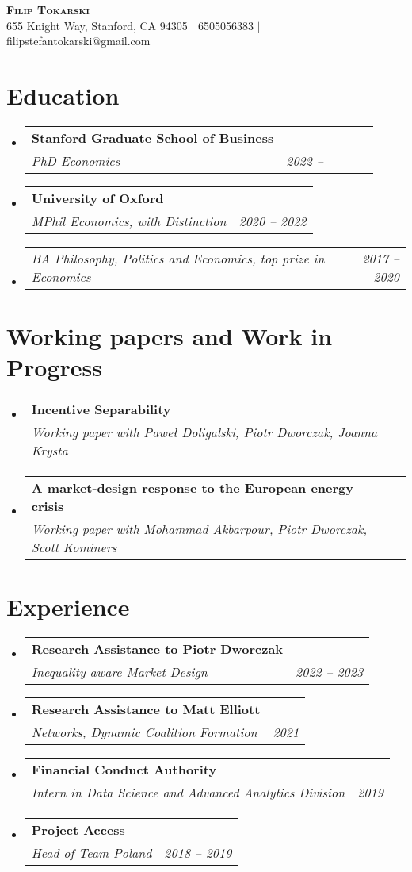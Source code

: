 \documentclass[letterpaper,11pt]{article}
\makeatletter
\newcommand{\resumeSubheading}[3]{
  \vspace{-2pt}\item
    \begin{tabular*}{0.97\textwidth}[t]{l@{\extracolsep{\fill}}r}
      \textbf{#1} \\
      \textit{\small#2} & \textit{\small #3} \\
    \end{tabular*}\vspace{-7pt}
}
\newcommand{\resumeSubSubheading}[2]{
    \item
    \begin{tabular*}{0.97\textwidth}{l@{\extracolsep{\fill}}r}
      \textit{\small#1} & \textit{\small #2} \\
    \end{tabular*}\vspace{-7pt}
}
\newcommand{\resumeSubHeadingListStart}{\begin{itemize}[leftmargin=0.15in, label={}]}
\newcommand{\resumeSubHeadingListEnd}{\end{itemize}}
\makeatother
\begin{document}
\begin{center}
    \textbf{\Huge \scshape Filip Tokarski} \\ \vspace{1pt}
    \small 655 Knight Way, Stanford, CA 94305 $|$
    \small 6505056383 $|$
    \small filipstefantokarski@gmail.com %
\end{center}



\section{Education}
  \resumeSubHeadingListStart
    \resumeSubheading
      {Stanford Graduate School of Business}
      {PhD Economics}{2022 -- \ \ \ \ \ \ }
    \resumeSubHeadingListEnd
  \resumeSubHeadingListStart
    \resumeSubheading
      {University of Oxford}
      {MPhil Economics, with Distinction}{2020 -- 2022}
        \resumeSubSubheading
      {BA Philosophy, Politics and Economics, top prize in Economics}{2017 -- 2020}
  \resumeSubHeadingListEnd

\bigskip



\section{Working papers and Work in Progress}
  \resumeSubHeadingListStart
    \resumeSubheading
      {Incentive Separability}
      {Working paper with Pawe\l{} Doligalski, Piotr Dworczak, Joanna Krysta}{}
    \resumeSubheading
      {A market-design response to the European energy crisis}
      {Working paper with Mohammad Akbarpour, Piotr Dworczak, Scott Kominers}{}
  \resumeSubHeadingListEnd

\bigskip




\section{Experience}
  \resumeSubHeadingListStart
      \resumeSubheading
      {Research Assistance to Piotr Dworczak}
      {Inequality-aware Market Design}{2022 -- 2023}
     \resumeSubheading
      {Research Assistance to Matt Elliott}
      {Networks, Dynamic Coalition Formation}{2021}
    \resumeSubheading
      {Financial Conduct Authority}
      {Intern in Data Science and Advanced Analytics Division}{2019}
    \resumeSubheading
      {Project Access}
      {Head of Team Poland}{2018 -- 2019}
  \resumeSubHeadingListEnd
\end{document}

